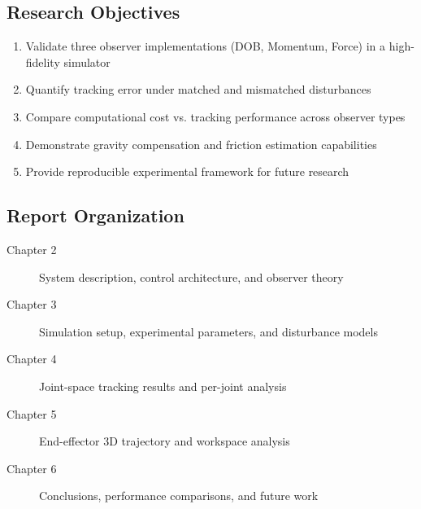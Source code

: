     \subsection{Research Objectives}
        \begin{enumerate}
            \item Validate three observer implementations (DOB, Momentum, Force) in a high-fidelity simulator
            \item Quantify tracking error under matched and mismatched disturbances
            \item Compare computational cost vs. tracking performance across observer types
            \item Demonstrate gravity compensation and friction estimation capabilities
            \item Provide reproducible experimental framework for future research
        \end{enumerate}

    \subsection{Report Organization}
        \begin{description}
            \item[Chapter 2] System description, control architecture, and observer theory
            \item[Chapter 3] Simulation setup, experimental parameters, and disturbance models
            \item[Chapter 4] Joint-space tracking results and per-joint analysis
            \item[Chapter 5] End-effector 3D trajectory and workspace analysis
            \item[Chapter 6] Conclusions, performance comparisons, and future work
        \end{description}